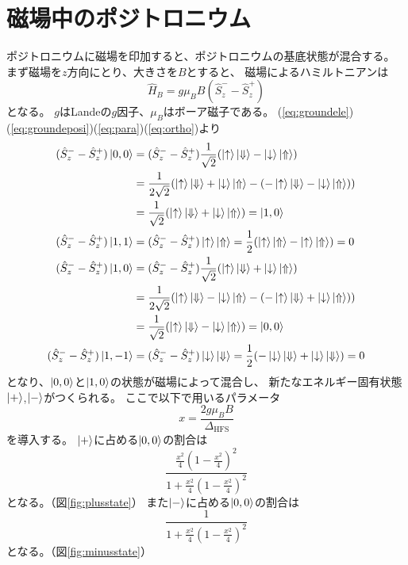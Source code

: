 \section{磁場中のポジトロニウム}
ポジトロニウムに磁場を印加すると、ポジトロニウムの基底状態が混合する。
まず磁場を$z$方向にとり、大きさを$B$とすると、
磁場によるハミルトニアンは
\begin{equation}
	\nonumber
\hat{H}_{B} = g\mu_{B}B(\hat{S}^{-}_{z} - \hat{S}^{+}_{z})
\end{equation}
となる。
$g$はLandeの$g$因子、$\mu_{B}$はボーア磁子である。%
(\ref{eq:groundele})(\ref{eq:groundeposi})(\ref{eq:para})(\ref{eq:ortho})より
\begin{align}
	\nonumber
(\hat{S}^{-}_{z} - \hat{S}^{+}_{z})\ket{0,0} &= (\hat{S}^{-}_{z} - \hat{S}^{+}_{z})\frac{1}{\sqrt{2}} ( \ket{ \uparrow } \ket{ \Downarrow } - \ket{ \downarrow } \ket{ \Uparrow }) \notag \\
&= \frac{1}{2\sqrt{2}} ( \ket{ \uparrow } \ket{ \Downarrow } + \ket{ \downarrow } \ket{ \Uparrow } - ( - \ket{ \uparrow } \ket{ \Downarrow } - \ket{ \downarrow } \ket{ \Uparrow } )) \notag \\
&= \frac{1}{\sqrt{2}} ( \ket{ \uparrow } \ket{ \Downarrow } + \ket{ \downarrow } \ket{ \Uparrow }) = \ket{1,0} \\
(\hat{S}^{-}_{z} - \hat{S}^{+}_{z})\ket{1,1}
&= (\hat{S}^{-}_{z} - \hat{S}^{+}_{z})\ket{ \uparrow } \ket{ \Uparrow }
=\frac{1}{2}( \ket{ \uparrow } \ket{ \Uparrow } - \ket{ \uparrow } \ket{ \Uparrow } )
= 0 \\
(\hat{S}^{-}_{z} - \hat{S}^{+}_{z})\ket{1,0} &= (\hat{S}^{-}_{z} - \hat{S}^{+}_{z})\frac{1}{\sqrt{2}} ( \ket{ \uparrow } \ket{ \Downarrow } + \ket{ \downarrow } \ket{ \Uparrow }) \notag \\
&= \frac{1}{2\sqrt{2}} ( \ket{ \uparrow } \ket{ \Downarrow } - \ket{ \downarrow } \ket{ \Uparrow } - ( - \ket{ \uparrow } \ket{ \Downarrow } + \ket{ \downarrow } \ket{ \Uparrow } )) \notag \\
&= \frac{1}{\sqrt{2}} ( \ket{ \uparrow } \ket{ \Downarrow } - \ket{ \downarrow } \ket{ \Uparrow }) = \ket{0,0} \\
(\hat{S}^{-}_{z} - \hat{S}^{+}_{z})\ket{1,-1}
&= (\hat{S}^{-}_{z} - \hat{S}^{+}_{z})\ket{ \downarrow } \ket{ \Downarrow }
=\frac{1}{2}( - \ket{ \downarrow } \ket{ \Downarrow } + \ket{ \downarrow } \ket{ \Downarrow } )
= 0
\end{align}
となり、$\ket{0,0}$と$\ket{1,0}$の状態が磁場によって混合し、
新たなエネルギー固有状態$\ket{+}$,$\ket{-}$がつくられる。
ここで以下で用いるパラメータ
\begin{equation}
	\nonumber
x = \frac{2g\mu_{B}B}{\Delta_{\mathrm{HFS}}}
\end{equation}
を導入する。
$\ket{+}$に占める$\ket{0,0}$の割合は
\begin{equation}
	\nonumber
\frac{\frac{x^{2}}{4}(1-\frac{x^{2}}{4})^{2}}{1+\frac{x^{2}}{4}(1-\frac{x^{2}}{4})^{2}}
\end{equation}
となる。（図\ref{fig:plusstate}）
また$\ket{-}$に占める$\ket{0,0}$の割合は
\begin{equation}
	\nonumber
\frac{1}{1+\frac{x^{2}}{4}(1-\frac{x^{2}}{4})^{2}}
\end{equation}
となる。（図\ref{fig:minusstate}）

